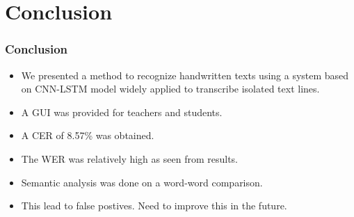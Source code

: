 \section{Conclusion}
\begin{frame}
\frametitle{Conclusion}
\begin{itemize}
    \item We presented a method to recognize handwritten texts using a 
    system based on CNN-LSTM model widely applied to transcribe 
    isolated text lines.
    \item A GUI was provided for teachers and students.
    \item A CER of 8.57\% was obtained.
    \item The WER was relatively high as seen from results.
    \item Semantic analysis was done on a word-word comparison.
    \item This lead to false postives. Need to improve this in the future.
\end{itemize}
\end{frame}